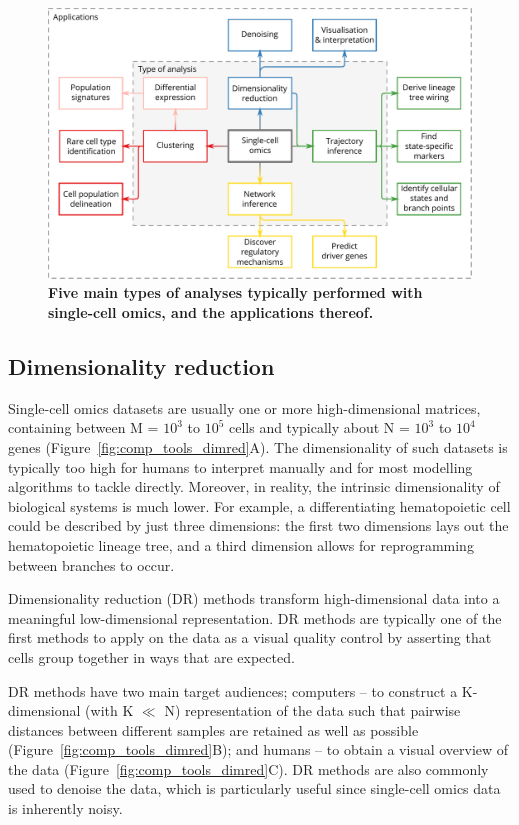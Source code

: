 \begin{figure}[htb!]
	\centering
	\includegraphics[width=\linewidth]{fig/singlecell_technologies_onlycore} 
	\caption{
		\textbf{Five main types of analyses typically performed with single-cell omics, and the applications thereof.}
	}
	\label{fig:scapplications}
\end{figure}


\subsection{Dimensionality reduction}
Single-cell omics datasets are usually one or more high-dimensional matrices, containing between M = $10^3$ to $10^5$ cells and typically about N = $10^3$ to $10^4$ genes (Figure~\ref{fig:comp_tools_dimred}A). The dimensionality of such datasets is typically too high for humans to interpret manually and for most modelling algorithms to tackle directly. 
Moreover, in reality, the intrinsic dimensionality of biological systems is much lower. For example, a differentiating hematopoietic cell could be described by just three dimensions: the first two dimensions lays out the hematopoietic lineage tree, and a third dimension allows for reprogramming between branches to occur.

Dimensionality reduction (DR) methods transform high-dimensional data into a meaningful low-dimensional representation. DR methods are typically one of the first methods to apply on the data as a visual quality control by asserting that cells group together in ways that are expected.

DR methods have two main target audiences; computers -- to construct a K-dimensional (with K $\ll$ N) representation of the data such that pairwise distances between different samples are retained as well as possible (Figure~\ref{fig:comp_tools_dimred}B); and humans -- to obtain a visual overview of the data (Figure~\ref{fig:comp_tools_dimred}C). DR methods are also commonly used to denoise the data, which is particularly useful since single-cell omics data is inherently noisy.

